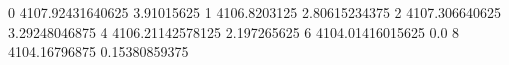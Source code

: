 0 4107.92431640625 3.91015625
1 4106.8203125 2.80615234375
2 4107.306640625 3.29248046875
4 4106.21142578125 2.197265625
6 4104.01416015625 0.0
8 4104.16796875 0.15380859375
